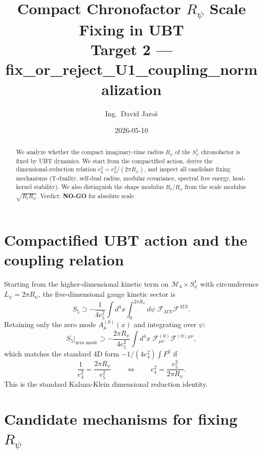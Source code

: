 \documentclass[11pt,a4paper]{article}
\title{Compact Chronofactor $R_\psi$ Scale Fixing in UBT\\
\large Target 2 — fix\_or\_reject\_U1\_coupling\_normalization}
\author{Ing.\ David Jaroš}
\date{2026-05-10}
\begin{document}
\maketitle

\begin{abstract}
We analyze whether the compact imaginary-time radius $R_\psi$ of the
$S^1_\psi$ chronofactor is fixed by UBT dynamics.  We start from the
compactified action, derive the dimensional-reduction relation
$e_4^2=e_5^2/(2\pi R_\psi)$, and inspect all candidate fixing mechanisms
(T-duality, self-dual radius, modular covariance, spectral free energy,
heat-kernel stability).  We also distinguish the shape modulus
$R_t/R_\psi$ from the scale modulus $\sqrt{R_t R_\psi}$.
Verdict: \textbf{NO-GO} for absolute scale.
\end{abstract}

\section{Compactified UBT action and the coupling relation}

Starting from the higher-dimensional kinetic term on $\mathcal{M}_4\times
S^1_\psi$ with circumference $L_\psi=2\pi R_\psi$, the five-dimensional
gauge kinetic sector is
\begin{equation}
  S_5 \supset -\frac{1}{4e_5^2}\int d^4x\int_0^{2\pi R_\psi}d\psi\;
  \mathcal{F}_{MN}\mathcal{F}^{MN}.
\end{equation}
Retaining only the zero mode $A_\mu^{(0)}(x)$ and integrating over $\psi$:
\begin{equation}
  S_5\big|_{\text{zero mode}}
  \supset -\frac{2\pi R_\psi}{4e_5^2}\int d^4x\;
  \mathcal{F}_{\mu\nu}^{(0)}\mathcal{F}^{(0)\mu\nu},
\end{equation}
which matches the standard 4D form $-1/(4e_4^2)\int F^2$ if
\begin{equation}
  \boxed{
    \frac{1}{e_4^2}=\frac{2\pi R_\psi}{e_5^2}
    \qquad\Longleftrightarrow\qquad
    e_4^2=\frac{e_5^2}{2\pi R_\psi}.
  }
  \label{eq:coupling-relation}
\end{equation}
This is the standard Kaluza-Klein dimensional reduction identity.

\section{Candidate mechanisms for fixing $R_\psi$}
\end{document}

